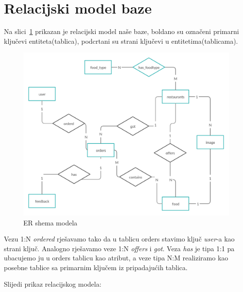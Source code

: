 \documentclass[12pt]{scrartcl}
\begin{document}
\section{Relacijski model baze}
Na slici~\ref{fig:er} prikazan je relacijski model naše baze, boldano su označeni primarni ključevi entiteta(tablica), podcrtani su strani ključevi u entitetima(tablicama).
\begin{figure}
    \centering
    \includegraphics[width=\textwidth]{slika.png}
    \caption{ER shema modela}
    \label{fig:er}
\end{figure}

Vezu 1:N \emph{ordered} rješavamo tako da u tablicu \textsf{orders} stavimo ključ \emph{user}-a kao strani ključ. Analogno rješavamo veze 1:N \emph{offers} i \emph{got}. Veza \emph{has} je tipa 1:1 pa ubacujemo ju u orders tablicu kao atribut, a veze tipa N:M realiziramo kao posebne tablice sa primarnim ključem iz pripadajućih tablica.

Slijedi prikaz relacijskog modela:
\end{document}
